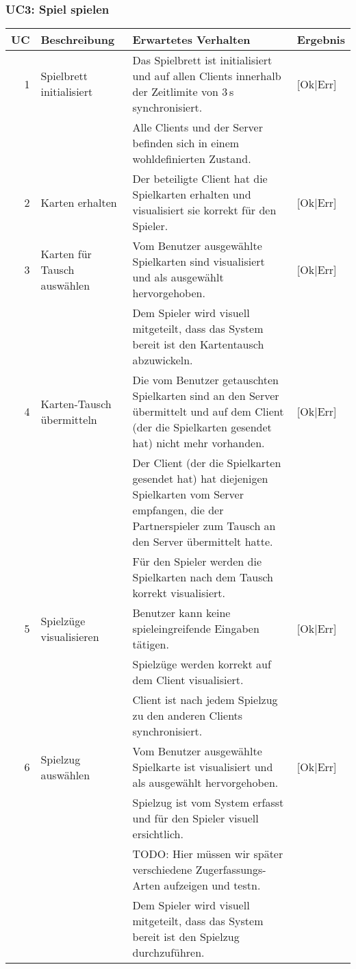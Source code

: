 \documentclass[12pt,halfparskip]{scrartcl}
\begin{document}
\subsubsection{UC3: Spiel spielen}
	\begin {tabular}{r | p{3cm} | p{9cm} | l}
		\toprule
		\textbf{UC} & \textbf{Beschreibung} & \textbf{Erwartetes Verhalten} & \textbf{Ergebnis} \\
		\midrule
		1 & Spielbrett initialisiert & Das Spielbrett ist initialisiert und auf allen Clients innerhalb der Zeitlimite von 3\,s synchronisiert. & [Ok|Err] \\
		 \cline{3-4} & & Alle Clients und der Server befinden sich in einem wohldefinierten Zustand. & \\
		\midrule
		2 & Karten erhalten & Der beteiligte Client hat die Spielkarten erhalten und visualisiert sie korrekt für den Spieler. & [Ok|Err] \\
		\midrule
		3 & Karten für Tausch auswählen & Vom Benutzer ausgewählte Spielkarten sind visualisiert und als ausgewählt hervorgehoben. & [Ok|Err] \\
		 \cline{3-4} & & Dem Spieler wird visuell mitgeteilt, dass das System bereit ist den Kartentausch abzuwickeln. & \\
		\midrule
		4 & Karten-Tausch übermitteln & Die vom Benutzer getauschten Spielkarten sind an den Server übermittelt und auf dem Client (der die Spielkarten gesendet hat) nicht mehr vorhanden. & [Ok|Err] \\
		 \cline{3-4} & & Der Client (der die Spielkarten gesendet hat) hat diejenigen Spielkarten vom Server empfangen, die der Partnerspieler zum Tausch an den Server übermittelt hatte. & \\
		 \cline{3-4} & & Für den Spieler werden die Spielkarten nach dem Tausch korrekt visualisiert. & \\
		\midrule
		5 & Spielzüge visualisieren & Benutzer kann keine spieleingreifende Eingaben tätigen. & [Ok|Err] \\
		 \cline{3-4} & & Spielzüge werden korrekt auf dem Client visualisiert. & \\
		 \cline{3-4} & & Client ist nach jedem Spielzug zu den anderen Clients synchronisiert. & \\
		\midrule
		6 & Spielzug auswählen & Vom Benutzer ausgewählte Spielkarte ist visualisiert und als ausgewählt hervorgehoben. & [Ok|Err] \\
		 \cline{3-4} & & Spielzug ist vom System erfasst und für den Spieler visuell ersichtlich. & \\
		 \cline{3-4} & & TODO: Hier müssen wir später verschiedene Zugerfassungs-Arten aufzeigen und testn. & \\
		 \cline{3-4} & & Dem Spieler wird visuell mitgeteilt, dass das System bereit ist den Spielzug durchzuführen. & \\
		\bottomrule
	\end{tabular}
	
\end{document}

